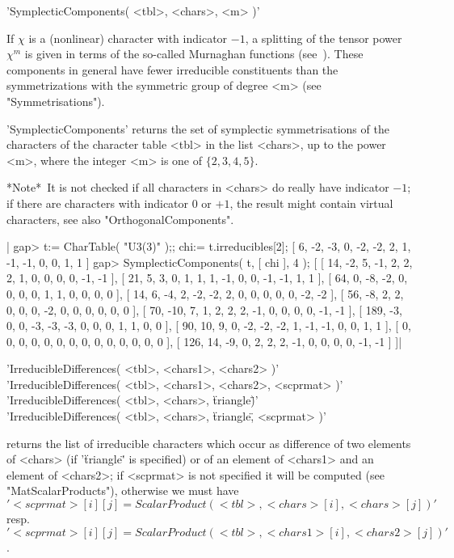 %
%

'SymplecticComponents( <tbl>, <chars>, <m> )'

If $\chi$ is a (nonlinear) character  with indicator $-1$, a splitting of
the tensor power  $\chi^m$ is given in terms  of the  so-called Murnaghan
functions   (see~\cite{Mur58}).  These components  in  general have fewer
irreducible  constituents   than the  symmetrizations  with the symmetric
group of degree <m> (see "Symmetrisations").

'SymplecticComponents' returns the  set of  symplectic symmetrisations of
the characters of the  character table <tbl>  in the list <chars>,  up to
the power <m>, where the integer <m> is one of $\{ 2, 3, 4, 5 \}$.

*Note*\:\ It is not checked  if all characters in <chars>  do really have
indicator $-1$;  if there are  characters with  indicator 0  or $+1$, the
result might contain virtual characters, see also "OrthogonalComponents".

|    gap> t:= CharTable( "U3(3)" );; chi:= t.irreducibles[2];
    [ 6, -2, -3, 0, -2, -2, 2, 1, -1, -1, 0, 0, 1, 1 ]
    gap> SymplecticComponents( t, [ chi ], 4 );
    [ [ 14, -2, 5, -1, 2, 2, 2, 1, 0, 0, 0, 0, -1, -1 ],
      [ 21, 5, 3, 0, 1, 1, 1, -1, 0, 0, -1, -1, 1, 1 ],
      [ 64, 0, -8, -2, 0, 0, 0, 0, 1, 1, 0, 0, 0, 0 ],
      [ 14, 6, -4, 2, -2, -2, 2, 0, 0, 0, 0, 0, -2, -2 ],
      [ 56, -8, 2, 2, 0, 0, 0, -2, 0, 0, 0, 0, 0, 0 ],
      [ 70, -10, 7, 1, 2, 2, 2, -1, 0, 0, 0, 0, -1, -1 ],
      [ 189, -3, 0, 0, -3, -3, -3, 0, 0, 0, 1, 1, 0, 0 ],
      [ 90, 10, 9, 0, -2, -2, -2, 1, -1, -1, 0, 0, 1, 1 ],
      [ 0, 0, 0, 0, 0, 0, 0, 0, 0, 0, 0, 0, 0, 0 ],
      [ 126, 14, -9, 0, 2, 2, 2, -1, 0, 0, 0, 0, -1, -1 ] ]|

%

'IrreducibleDifferences( <tbl>, <chars1>, <chars2> )'\\
'IrreducibleDifferences( <tbl>, <chars1>, <chars2>, <scprmat> )'\\
'IrreducibleDifferences( <tbl>, <chars>, \"triangle\" )'\\
'IrreducibleDifferences( <tbl>, <chars>, \"triangle\", <scprmat> )'

returns the  list of irreducible  characters which occur as difference of
two elements of <chars> (if '\"triangle\"' is specified) or of an element
of <chars1> and an element of <chars2>; if  <scprmat> is not specified it
will be computed (see "MatScalarProducts"), otherwise we must have
\[
  '<scprmat>[i][j] = ScalarProduct( <tbl>, <chars>[i], <chars>[j] )'
\]
resp.
\[
  '<scprmat>[i][j] = ScalarProduct( <tbl>, <chars1>[i], <chars2>[j] )'
\].

